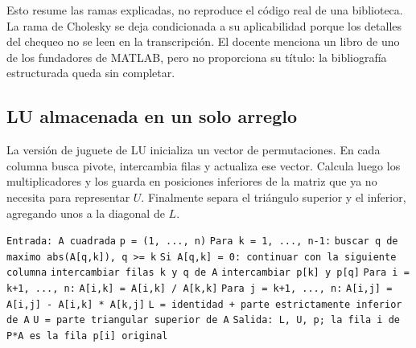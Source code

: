 \documentclass[12pt,a4paper]{article}
\begin{document}
Esto resume las ramas explicadas, no reproduce el código real de una biblioteca. La rama de Cholesky se deja condicionada a su aplicabilidad porque los detalles del chequeo no se leen en la transcripción. El docente menciona un libro de uno de los fundadores de MATLAB, pero no proporciona su título: la bibliografía estructurada queda sin completar.

\subsection{LU almacenada en un solo arreglo}

La versión de juguete de LU inicializa un vector de permutaciones. En cada columna busca pivote, intercambia filas y actualiza ese vector. Calcula luego los multiplicadores y los guarda en posiciones inferiores de la matriz que ya no necesita para representar $U$. Finalmente separa el triángulo superior y el inferior, agregando unos a la diagonal de $L$.

\begin{algorithm}[H]
\small\DontPrintSemicolon
\hspace*{0.0em}\texttt{Entrada: A cuadrada}\;
\hspace*{0.0em}\texttt{p = (1, ..., n)}\;
\hspace*{0.0em}\texttt{Para k = 1, ..., n-1:}\;
\hspace*{0.7em}\texttt{buscar q de maximo abs(A[q,k]), q >= k}\;
\hspace*{0.7em}\texttt{Si A[q,k] = 0: continuar con la siguiente columna}\;
\hspace*{0.7em}\texttt{intercambiar filas k y q de A}\;
\hspace*{0.7em}\texttt{intercambiar p[k] y p[q]}\;
\hspace*{0.7em}\texttt{Para i = k+1, ..., n:}\;
\hspace*{1.4em}\texttt{A[i,k] = A[i,k] / A[k,k]}\;
\hspace*{1.4em}\texttt{Para j = k+1, ..., n:}\;
\hspace*{2.0999999999999996em}\texttt{A[i,j] = A[i,j] - A[i,k] * A[k,j]}\;
\hspace*{0.0em}\texttt{L = identidad + parte estrictamente inferior de A}\;
\hspace*{0.0em}\texttt{U = parte triangular superior de A}\;
\hspace*{0.0em}\texttt{Salida: L, U, p; la fila i de P*A es la fila p[i] original}\;
\end{algorithm}
\end{document}
